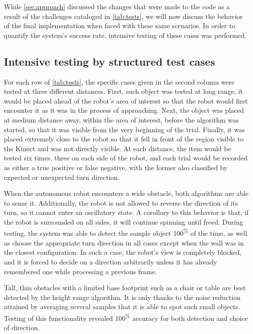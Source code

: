 \documentclass[12pt]{report}
\begin{document}
While \autoref{sec:approach} discussed the changes that were made to the code as a result of the challenges cataloged in \autoref{tab:tests}, we will now discuss the behavior of the final implementation when faced with these same scenarios.  In order to quantify the system's success rate, intensive testing of these cases was performed.

\subsection[Intensive testing]{Intensive testing by structured test cases}
For each row of \autoref{tab:tests}, the specific cases given in the second column were tested at three different distances.  First, each object was tested at long range; it would be placed ahead of the robot's area of interest so that the robot would first encounter it as it was in the process of approaching.  Next, the object was placed at medium distance away, within the area of interest, before the algorithm was started, so that it was visible from the very beginning of the trial.  Finally, it was placed extremely close to the robot so that it fell in front of the region visible to the Kinect and was not directly visible.  At each distance, the item would be tested six times, three on each side of the robot, and each trial would be recorded as either a true positive or false negative, with the former also classified by expected or unexpected turn direction.

When the autonomous robot encounters a wide obstacle, both algorithms are able to sense it.  Additionally, the robot is not allowed to reverse the direction of its turn, so it cannot enter an oscillatory state.  A corollary to this behavior is that, if the robot is surrounded on all sides, it will continue spinning until freed.  During testing, the system was able to detect the sample object 100\textsuperscript{\%} of the time, as well as choose the appropriate turn direction in all cases except when the wall was in the closest configuration.  In such a case, the robot's view is completely blocked, and it is forced to decide on a direction arbitrarily unless it has already remembered one while processing a previous frame.

Tall, thin obstacles with a limited base footprint such as a chair or table are best detected by the height range algorithm.  It is only thanks to the noise reduction attained by averaging several samples that it is able to spot such small objects.  Testing of this functionality revealed 100\textsuperscript{\%} accuracy for both detection and choice of direction.
\end{document}
